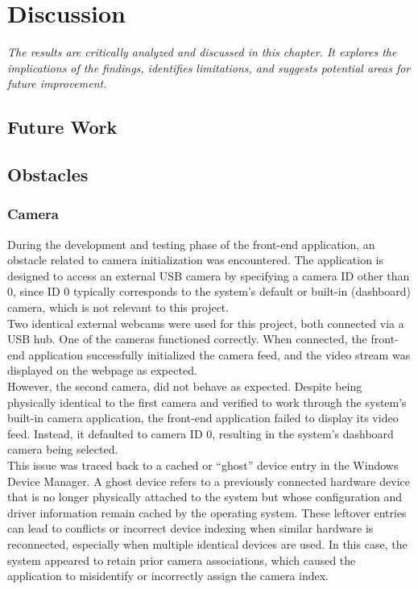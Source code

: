 \chapter{Discussion}

\begin{center}
    \textit{The results are critically analyzed and discussed in this chapter. It explores the implications of the findings, identifies limitations, and suggests potential areas for future improvement.}
\end{center}

\section{Future Work}

\section{Obstacles}
\subsection{Camera}
During the development and testing phase of the front-end application, an obstacle related to camera initialization was encountered. The application is designed to access an external USB camera by specifying a camera ID other than 0, since ID 0 typically corresponds to the system's default or built-in (dashboard) camera, which is not relevant to this project.\\

Two identical external webcams were used for this project, both connected via a USB hub. One of the cameras functioned correctly. When connected, the front-end application successfully initialized the camera feed, and the video stream was displayed on the webpage as expected.\\

However, the second camera, did not behave as expected. Despite being physically identical to the first camera and verified to work through the system's built-in camera application, the front-end application failed to display its video feed. Instead, it defaulted to camera ID 0, resulting in the system's dashboard camera being selected.\\

This issue was traced back to a cached or “ghost” device entry in the Windows Device Manager. A ghost device refers to a previously connected hardware device that is no longer physically attached to the system but whose configuration and driver information remain cached by the operating system. These leftover entries can lead to conflicts or incorrect device indexing when similar hardware is reconnected, especially when multiple identical devices are used. In this case, the system appeared to retain prior camera associations, which caused the application to misidentify or incorrectly assign the camera index.